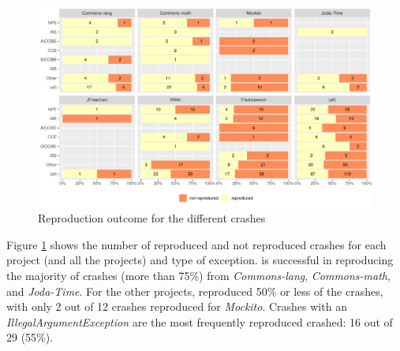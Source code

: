 \begin{figure}[t]
	\centering
	\includegraphics[width=\textwidth]{papers/jcrashpack/rq1_crashes.pdf}
	\caption{Reproduction outcome for the different crashes}
	\label{fig:rq1crashes}
\end{figure}

Figure \ref{fig:rq1crashes} shows the number of reproduced and not reproduced crashes for each project (and all the projects) and type of exception.
\evocrash is successful in reproducing the majority of crashes (more than 75\%) from \textit{Commons-lang}, \textit{Commons-math}, and \textit{Joda-Time}. 
For the other projects, \evocrash reproduced 50\% or less of the crashes, with only 2 out of 12 crashes reproduced for \textit{Mockito}.
%
Crashes with an \textit{IllegalArgumentException} are the most frequently reproduced crashed: 16 out of 29 (55\%).

